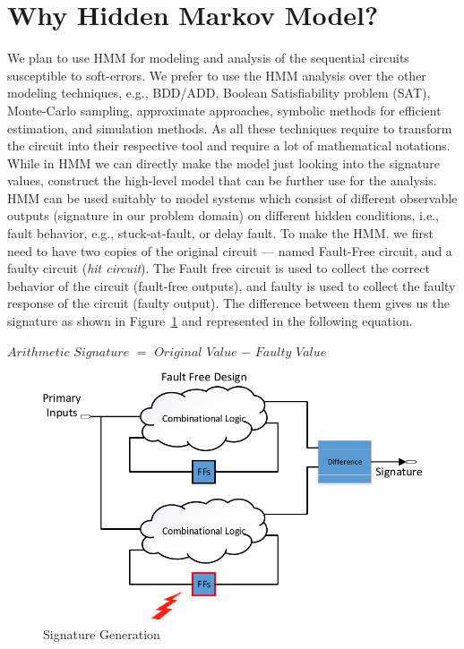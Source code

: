 \section{Why Hidden Markov Model?}
We plan to use HMM for modeling and analysis of the sequential circuits susceptible to soft-errors. We prefer to use the HMM analysis over the other modeling techniques, e.g., BDD/ADD, Boolean Satisfiability problem (SAT), Monte-Carlo sampling, approximate approaches, symbolic methods for efficient estimation, and simulation methods. As all these techniques require to transform the circuit into their respective tool and require a lot of mathematical notations. While in HMM we can directly make the model just looking into the signature values, construct the high-level model that can be further use for the analysis. HMM can be used suitably to model systems which consist of different observable outputs (signature in our problem domain) on different hidden conditions, i.e., fault behavior, e.g., stuck-at-fault, or delay fault.
To make the HMM. we first need to have two copies of the original circuit --- named Fault-Free circuit, and a faulty circuit (\textit{hit circuit}). The Fault free circuit is used to collect the correct behavior of the circuit (fault-free outputs), and faulty is used to collect the faulty response of the circuit (faulty output). The difference between them gives us the signature as shown in Figure~\ref{fig:SG} and represented in the following equation.
\begin{center}
$Arithmetic$ $Signature$ $=$ $Original$ $Value$ $-$ $Faulty$ $Value$
\end{center}
 \begin{figure}[tb!]
 \centering
  \captionsetup{justification=centering}    
   \includegraphics[scale=0.8]{Figures/signature1.pdf}
   \caption{Signature Generation}
\label{fig:SG}
\end{figure}

